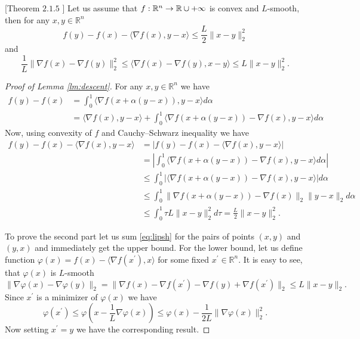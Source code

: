 \begin{lemma}\label{lm:descent}[Theorem $2.1.5$ \cite{nesterov-book}]
    Let us assume that $f:\mathbb{R}^n\rightarrow \mathbb{R}\cup{+\infty}$ is convex and $L$-smooth, then for any $x,y\in\mathbb{R}^n$
    \begin{equation}\label{eq:descent_lemma_1}
        f(y) - f(x) - \langle \nabla f(x), y-x\rangle\leq \frac{L}{2}\|x-y\|_2^2
    \end{equation}
    and
    \begin{equation}\label{eq:descent_lemma_2}
        \frac{1}{L}\|\nabla f(x) - \nabla f(y)\|_2^2 \leq\langle \nabla f(x) - \nabla f (y), x - y\rangle \leq L\|x-y\|_2^2.
    \end{equation}
\end{lemma}
\begin{proof}[Proof of Lemma \ref{lm:descent}]
   For any $x,y\in\mathbb{R}^n$ we have
   \begin{align}
        f(y) - f(x)  &= \int_0^1\langle\nabla f(x + \alpha(y-x)), y-x\rangle d\alpha\nonumber\\
         &= \langle \nabla f(x), y-x\rangle + \int_0^1\langle\nabla f(x + \alpha(y-x)) - \nabla f(x), y-x\rangle d\alpha
   \end{align}
Now, using  convexity of $f$ and Cauchy–Schwarz inequality we have
\begin{align}\label{eq:lipsh}
    f(y)-f(x) - \langle \nabla f(x), y-x\rangle &= |f(y)-f(x) - \langle \nabla f(x), y-x\rangle|\nonumber\\ &= \left|\int_0^1\langle\nabla f(x + \alpha(y-x)) - \nabla f(x), y-x\rangle d\alpha\right|\nonumber\\
 &\leq \int_0^1|\langle\nabla f(x + \alpha(y-x)) - \nabla f(x), y-x\rangle| d\alpha\nonumber\\
&\leq\int_0^1\|\nabla f(x + \alpha(y-x)) - \nabla f(x)\|_2\|y-x\|_2 d\alpha\nonumber\\
&\leq \int_0^1\tau L\|x-y\|_2^2 d\tau = \frac{L}{2}\|x-y\|_2^2.
\end{align}

To prove the second part let us sum \eqref{eq:lipsh} for the pairs of points $(x,y)$ and $(y,x)$ and immediately get the upper bound.
For the lower bound, let us define function $\varphi(x)  = f(x) - \langle \nabla f(x^\prime), x\rangle$ for some fixed $x^\prime\in\mathbb{R}^n$.
It is easy to see, that $\varphi(x)$ is $L$-smooth
$$
\|\nabla\varphi(x) - \nabla\varphi(y)\|_2 = \|\nabla f(x) - \nabla f(x^\prime) - \nabla f(y) + \nabla f(x^\prime)\|_2\leq L\|x-y\|_2.
$$
Since $x^\prime$ is a minimizer of $\varphi(x)$ we have
\begin{equation}
\varphi(x^\prime) \leq \varphi(x - \frac{1}{L}\nabla \varphi(x))\leq \varphi(x) - \frac{1}{2L}\|\nabla \varphi(x)\|_2^2. 
\end{equation}
Now setting $x^\prime = y$ we have the corresponding result.
\end{proof}

